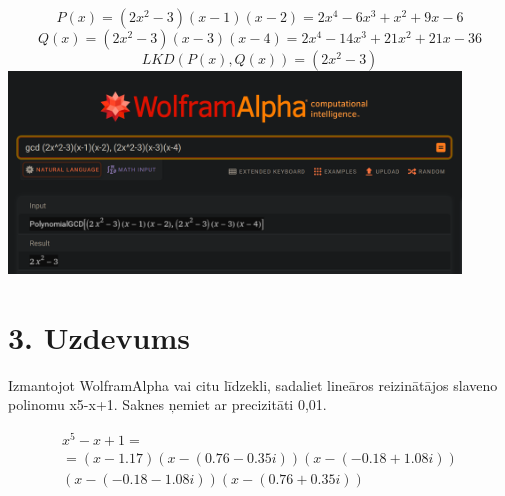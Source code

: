\documentclass{article}
\begin{document}
\begin{equation*}
    P(x) = (2x^2-3)(x-1)(x-2) = 2x^4-6x^3+x^2+9x-6
\end{equation*}
\begin{equation*}
    Q(x) = (2x^2-3)(x-3)(x-4) = 2x^4-14x^3+21x^2+21x-36
\end{equation*}
\begin{equation*}
    LKD(P(x), Q(x)) = (2x^2-3)
\end{equation*}
\includegraphics[width=0.9\textwidth, center]{2}

\section*{3. Uzdevums}
Izmantojot WolframAlpha vai citu līdzekli, sadaliet lineāros reizinātājos slaveno polinomu x5-x+1. Saknes ņemiet ar precizitāti 0,01.

\begin{gather*}
    x^5-x+1 = \\ = (x-1.17)(x-(0.76 - 0.35i))(x-(-0.18 + 1.08i))\\(x-(-0.18 - 1.08i))(x-(0.76 + 0.35i))
\end{gather*}
\end{document}
